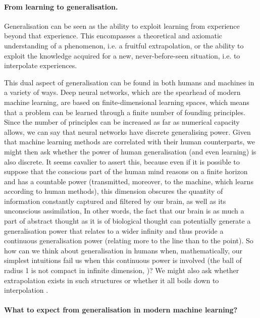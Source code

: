 \paragraph{From learning to generalisation.}

Generalisation can be seen as the ability to exploit learning from experience beyond that experience. This encompasses a theoretical and axiomatic understanding of a phenomenon, i.e. a fruitful extrapolation, or the ability to exploit the knowledge acquired for a new, never-before-seen situation, i.e. to interpolate experiences. 

This dual aspect of generalisation can be found in both humans and machines in a variety of ways. Deep neural networks, which are the spearhead of modern machine learning, are based on finite-dimensional learning spaces, which means that a problem can be learned through a finite number of founding principles. Since the number of principles can be increased as far as numerical capacity allows, we can say that neural networks have discrete generalising power. Given that machine learning methods are correlated with their human counterparts, we might then ask whether the power of human generalisation (and even learning) is also discrete. It seems cavalier to assert this, because even if it is possible to suppose that the conscious part of the human mind reasons on a finite horizon and has a countable power (transmitted, moreover, to the machine, which learns according to human methods), this dimension obscures the quantity of information constantly captured and filtered by our brain, as well as its unconscious assimilation, In other words, the fact that our brain is as much a part of abstract thought as it is of biological thought can potentially generate a generalisation power that relates to a wider infinity and thus provide a continuous generalisation power (relating more to the line than to the point). So how can we think about generalisation in humans when, mathematically, our simplest intuitions fail us when this continuous power is involved (the ball of radius 1 is not compact in infinite dimension, \citealp{riesz1955lecons})? We might also ask whether extrapolation exists in such structures or whether it all boils down to interpolation \citep{hasson2020direct}.

\paragraph{What to expect from generalisation in modern machine learning?}

